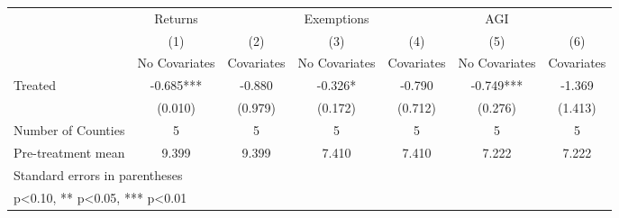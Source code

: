 {
\def\sym#1{\ifmmode^{#1}\else\(^{#1}\)\fi}
\begin{tabular}{l*{6}{c}}
\hline\hline
            &     Returns   &               &  Exemptions   &               &         AGI   &               \\
            &\multicolumn{1}{c}{(1)}&\multicolumn{1}{c}{(2)}&\multicolumn{1}{c}{(3)}&\multicolumn{1}{c}{(4)}&\multicolumn{1}{c}{(5)}&\multicolumn{1}{c}{(6)}\\
            &\multicolumn{1}{c}{No Covariates}&\multicolumn{1}{c}{Covariates}&\multicolumn{1}{c}{No Covariates}&\multicolumn{1}{c}{Covariates}&\multicolumn{1}{c}{No Covariates}&\multicolumn{1}{c}{Covariates}\\
\hline
Treated     &      -0.685***&      -0.880   &      -0.326*  &      -0.790   &      -0.749***&      -1.369   \\
            &     (0.010)   &     (0.979)   &     (0.172)   &     (0.712)   &     (0.276)   &     (1.413)   \\
\hline
Number of Counties&           5   &           5   &           5   &           5   &           5   &           5   \\
Pre-treatment mean&       9.399   &       9.399   &       7.410   &       7.410   &       7.222   &       7.222   \\
\hline\hline
\multicolumn{7}{l}{\footnotesize Standard errors in parentheses}\\
\multicolumn{7}{l}{\footnotesize * p<0.10, ** p<0.05, *** p<0.01}\\
\end{tabular}
}
